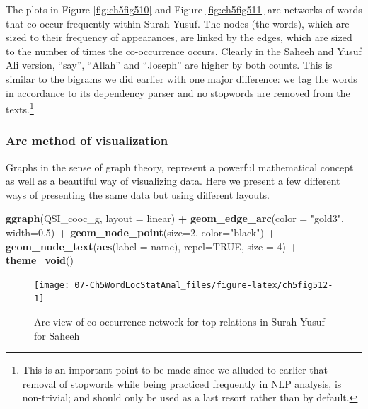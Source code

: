 \documentclass[
]{article}
\newenvironment{Shaded}{\begin{snugshade}}{\end{snugshade}}
\newcommand{\AttributeTok}[1]{\textcolor[rgb]{0.13,0.29,0.53}{#1}}
\newcommand{\ConstantTok}[1]{\textcolor[rgb]{0.56,0.35,0.01}{#1}}
\newcommand{\DecValTok}[1]{\textcolor[rgb]{0.00,0.00,0.81}{#1}}
\newcommand{\FloatTok}[1]{\textcolor[rgb]{0.00,0.00,0.81}{#1}}
\newcommand{\FunctionTok}[1]{\textcolor[rgb]{0.13,0.29,0.53}{\textbf{#1}}}
\newcommand{\NormalTok}[1]{#1}
\newcommand{\SpecialCharTok}[1]{\textcolor[rgb]{0.81,0.36,0.00}{\textbf{#1}}}
\newcommand{\StringTok}[1]{\textcolor[rgb]{0.31,0.60,0.02}{#1}}
\begin{document}
The plots in Figure \ref{fig:ch5fig510} and Figure \ref{fig:ch5fig511} are networks of words that co-occur frequently within Surah Yusuf. The nodes (the words), which are sized to their frequency of appearances, are linked by the edges, which are sized to the number of times the co-occurrence occurs. Clearly in the Saheeh and Yusuf Ali version, ``say'', ``Allah'' and ``Joseph'' are higher by both counts. This is similar to the bigrams we did earlier with one major difference: we tag the words in accordance to its dependency parser and no stopwords are removed from the texts.\footnote{This is an important point to be made since we alluded to earlier that removal of stopwords while being practiced frequently in NLP analysis, is non-trivial; and should only be used as a last resort rather than by default.}

\hypertarget{arc-method-of-visualization}{%
\subsubsection{Arc method of visualization}\label{arc-method-of-visualization}}

Graphs in the sense of graph theory, represent a powerful mathematical concept as well as a beautiful way of visualizing data. Here we present a few different ways of presenting the same data but using different layouts.

\begin{Shaded}
\begin{Highlighting}[]
\FunctionTok{ggraph}\NormalTok{(QSI\_cooc\_g, }\AttributeTok{layout =} \StringTok{\textquotesingle{}linear\textquotesingle{}}\NormalTok{) }\SpecialCharTok{+} 
    \FunctionTok{geom\_edge\_arc}\NormalTok{(}\AttributeTok{color =} \StringTok{"gold3"}\NormalTok{, }\AttributeTok{width=}\FloatTok{0.5}\NormalTok{) }\SpecialCharTok{+}
    \FunctionTok{geom\_node\_point}\NormalTok{(}\AttributeTok{size=}\DecValTok{2}\NormalTok{, }\AttributeTok{color=}\StringTok{"black"}\NormalTok{) }\SpecialCharTok{+}
    \FunctionTok{geom\_node\_text}\NormalTok{(}\FunctionTok{aes}\NormalTok{(}\AttributeTok{label =}\NormalTok{ name), }\AttributeTok{repel=}\ConstantTok{TRUE}\NormalTok{, }\AttributeTok{size =} \DecValTok{4}\NormalTok{) }\SpecialCharTok{+}
    \FunctionTok{theme\_void}\NormalTok{()}
\end{Highlighting}
\end{Shaded}

\begin{figure}

{\centering \texttt{[image: 07-Ch5WordLocStatAnal\_files/figure-latex/ch5fig512-1]} 

}

\caption{Arc view of co-occurrence network for top relations in Surah Yusuf for Saheeh}\label{fig:ch5fig512}
\end{figure}
\end{document}
